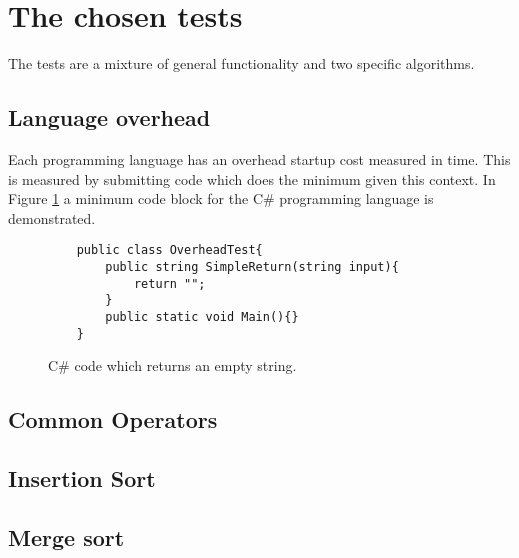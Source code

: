 \section{The chosen tests}
The tests are a mixture of general functionality and two specific algorithms.

\subsection{Language overhead}
Each programming language has an overhead startup cost measured in time. This is measured by submitting code which does the minimum given this context. In Figure \ref{fig:minimum_code} a minimum code block for the C\# programming language is demonstrated.

\begin{figure}[h]
	\lstset{style=sharpc}
	\begin{lstlisting}
	public class OverheadTest{
		public string SimpleReturn(string input){
			return "";
		}
		public static void Main(){}
	}
	\end{lstlisting}
	\caption{C\# code which returns an empty string.}
	\label{fig:minimum_code}
\end{figure}

\subsection{Common Operators}

\subsection{Insertion Sort}

\subsection{Merge sort}